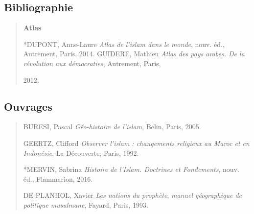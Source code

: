 \subsection{Bibliographie}

\begin{quote}
\textbf{Atlas}

*DUPONT, Anne-Laure \emph{Atlas de l'islam dans le monde}, nouv. éd.,
Autrement, Paris, 2014. GUIDERE, Mathieu \emph{Atlas des pays arabes. De
la révolution aux démocraties}, Autrement, Paris,

2012.
\end{quote}

\hypertarget{ouvrages}{%
\subsection{Ouvrages}\label{ouvrages}}

\begin{quote}
BURESI, Pascal \emph{Géo-histoire de l'islam}, Belin, Paris, 2005.

GEERTZ, Clifford \emph{Observer l'islam : changements religieux au Maroc
et en Indonésie}, La Découverte, Paris, 1992.

*MERVIN, Sabrina \emph{Histoire de l'Islam. Doctrines et Fondements},
nouv. éd., Flammarion, 2016.

DE PLANHOL, Xavier \emph{Les nations du prophète}, \emph{manuel
géographique de politique musulmane}, Fayard, Paris, 1993.
\end{quote}